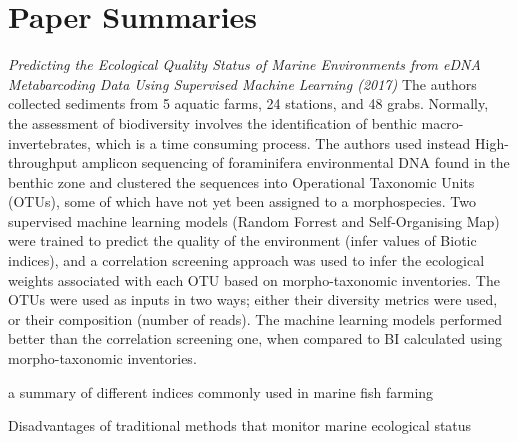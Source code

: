 \chapter{Paper Summaries}
\textit{Predicting the Ecological Quality Status of Marine Environments from eDNA Metabarcoding Data Using Supervised Machine Learning (2017)}
The authors collected sediments from 5 aquatic farms, 24 stations, and 48 grabs. Normally, the assessment of biodiversity involves the identification of benthic macro-invertebrates, which is a time consuming process. The authors used instead High-throughput amplicon sequencing of foraminifera environmental DNA found in the benthic zone and clustered the sequences into Operational Taxonomic Units (OTUs), some of which have not yet been assigned to a morphospecies. Two supervised machine learning models (Random Forrest and Self-Organising Map) were trained to predict the quality of the environment (infer values of Biotic indices), and a correlation screening approach was used to infer the ecological weights associated with each OTU based on morpho-taxonomic inventories. The OTUs were used as inputs in two ways; either their diversity metrics were used, or their composition (number of reads). The machine learning models performed better than the correlation screening one, when compared to BI calculated using morpho-taxonomic inventories.



a summary of different indices commonly used in marine fish farming \cite{BORJA2009231}

Disadvantages of traditional methods that monitor marine ecological status \cite{goodwin_traditional_env_monitoring}



